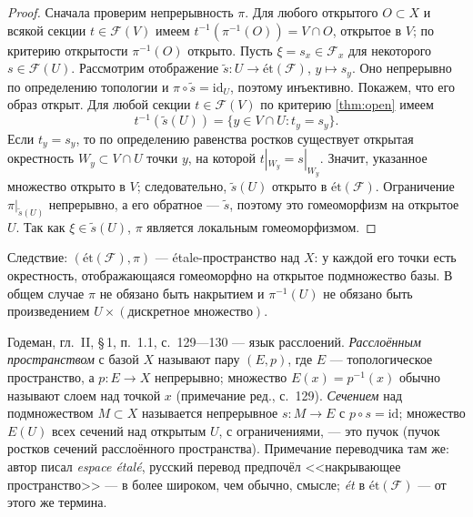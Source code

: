 \documentclass[11pt,b5paper]{article}
\newcommand{\et}{\text{ét}}
\newcommand{\id}{\mathrm{id}}
\newcommand{\Shv}[1]{\mathscr{#1}}   %
\theoremstyle{plain}
\theoremstyle{definition}
\theoremstyle{remark}
\newenvironment{bookbox}{\par\smallskip\begingroup\color{gray}\noindent
  \ignorespaces}{\par\endgroup\smallskip}
\newcommand{\booksrc}[1]{%
  \noindent{\bfseries\small Дополнение из книги:}\par\smallskip
  \noindent#1\par\smallskip}
\begin{document}
\begin{proof}
Сначала проверим непрерывность $\pi$. Для любого открытого $O\subset X$
и всякой секции $t\in\Shv{F}(V)$ имеем
$t^{-1}(\pi^{-1}(O))=V\cap O$, открытое в $V$; по критерию
открытости $\pi^{-1}(O)$ открыто.
Пусть $\xi=s_x\in\Shv{F}_x$ для некоторого $s\in\Shv{F}(U)$.
Рассмотрим отображение $\widetilde s:U\to\et(\Shv{F})$,
$y\mapsto s_y$. Оно непрерывно по определению топологии и
$\pi\circ\widetilde s=\id_U$, поэтому инъективно. Покажем, что его
образ открыт. Для любой секции $t\in\Shv{F}(V)$ по критерию
\ref{thm:open} имеем
\[
 t^{-1}(\widetilde s(U))=\{y\in V\cap U:t_y=s_y\}.
\]
Если $t_y=s_y$, то по определению равенства ростков существует открытая
окрестность $W_y\subset V\cap U$ точки $y$, на которой
$t|_{W_y}=s|_{W_y}$. Значит, указанное множество открыто в $V$;
следовательно, $\widetilde s(U)$ открыто в $\et(\Shv{F})$.
Ограничение $\pi|_{\widetilde s(U)}$ непрерывно, а его обратное ---
$\widetilde s$, поэтому это гомеоморфизм на открытое $U$. Так как
$\xi\in\widetilde s(U)$, $\pi$ является локальным гомеоморфизмом.
\end{proof}

Следствие: $(\et(\Shv{F}),\pi)$ --- étale-пространство над $X$:
у каждой его точки есть окрестность, отображающаяся гомеоморфно на
открытое подмножество базы. В общем случае $\pi$ не обязано быть
накрытием и $\pi^{-1}(U)$ не обязано быть произведением
$U\times(\text{дискретное множество})$.

\begin{bookbox}
\booksrc{Годеман, гл.~II, \S\,1, п.~1.1, с.~129---130 --- язык
 расслоений. \emph{Расслоённым пространством} с базой $X$ называют
 пару $(E,p)$, где $E$ --- топологическое пространство, а
 $p\colon E\to X$ непрерывно; множество $E(x)=p^{-1}(x)$ обычно
 называют слоем над точкой $x$ (примечание ред., с.~129).
 \emph{Сечением} над подмножеством $M\subset X$ называется
 непрерывное $s\colon M\to E$ с $p\circ s=\id$; множество $E(U)$
 всех сечений над открытым $U$, с ограничениями, --- это пучок
 (пучок ростков сечений расслоённого пространства). Примечание
 переводчика там же: автор писал \emph{espace étalé}, русский
 перевод предпочёл <<накрывающее пространство>> --- в более
 широком, чем обычно, смысле; \emph{ét} в $\et(\Shv{F})$ ---
 от этого же термина.}
\end{bookbox}
\end{document}
